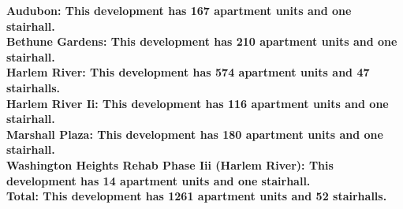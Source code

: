 \bf{Audubon}: This development has 167 apartment units and one stairhall.\\\bf{Bethune Gardens}: This development has 210 apartment units and one stairhall.\\\bf{Harlem River}: This development has 574 apartment units and 47 stairhalls.\\\bf{Harlem River Ii}: This development has 116 apartment units and one stairhall.\\\bf{Marshall Plaza}: This development has 180 apartment units and one stairhall.\\\bf{Washington Heights Rehab Phase Iii (Harlem River)}: This development has 14 apartment units and one stairhall.\\\bf{Total}: This development has 1261 apartment units and 52 stairhalls.\\